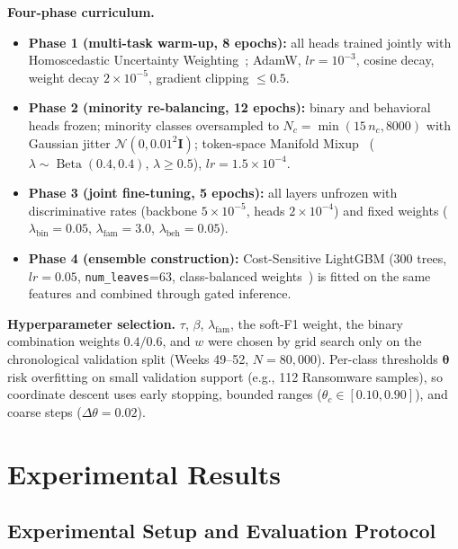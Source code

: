 \documentclass[Number]{sn-jnl}
\begin{document}
\noindent\textbf{Four-phase curriculum.}
\begin{itemize}[leftmargin=*]
\item \textbf{Phase 1 (multi-task warm-up, 8 epochs):} all heads trained jointly with Homoscedastic Uncertainty Weighting~\cite{kendall2018multi}; AdamW, $lr=10^{-3}$, cosine decay, weight decay $2\times10^{-5}$, gradient clipping $\le0.5$.
\item \textbf{Phase 2 (minority re-balancing, 12 epochs):} binary and behavioral heads frozen; minority classes oversampled to $N_c=\min(15\,n_c,8000)$ with Gaussian jitter $\mathcal{N}(0,0.01^2\mathbf{I})$; token-space Manifold Mixup~\cite{verma2019manifold} ($\lambda\sim\operatorname{Beta}(0.4,0.4)$, $\lambda\ge0.5$), $lr=1.5\times10^{-4}$.
\item \textbf{Phase 3 (joint fine-tuning, 5 epochs):} all layers unfrozen with discriminative rates (backbone $5\times10^{-5}$, heads $2\times10^{-4}$) and fixed weights ($\lambda_\text{bin}=0.05$, $\lambda_\text{fam}=3.0$, $\lambda_\text{beh}=0.05$).
\item \textbf{Phase 4 (ensemble construction):} Cost-Sensitive LightGBM (300 trees, $lr=0.05$, \texttt{num\_leaves}=63, class-balanced weights~\cite{cui2019class}) is fitted on the same features and combined through gated inference.
\end{itemize}

\noindent\textbf{Hyperparameter selection.}
$\tau$, $\beta$, $\lambda_\text{fam}$, the soft-F1 weight, the binary combination weights $0.4/0.6$, and $w$ were chosen by grid search only on the chronological validation split (Weeks 49--52, $N=80{,}000$). Per-class thresholds $\boldsymbol{\theta}$ risk overfitting on small validation support (e.g., 112 Ransomware samples), so coordinate descent uses early stopping, bounded ranges ($\theta_c\in[0.10,0.90]$), and coarse steps ($\Delta\theta=0.02$).


\section{Experimental Results}\label{sec:results}

\subsection{Experimental Setup and Evaluation Protocol}\label{subsec:setup}
\end{document}
